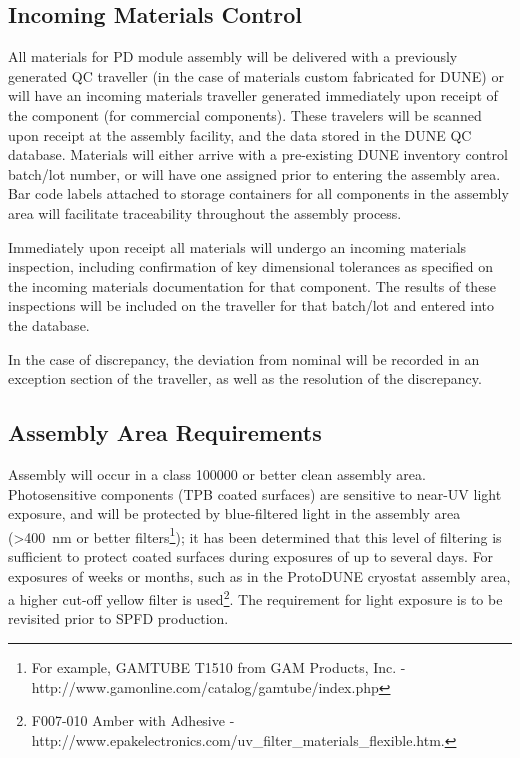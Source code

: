 \subsection{Incoming Materials Control}

All materials for PD module assembly will be delivered with a previously generated QC traveller (in the case of materials custom fabricated for DUNE) or will have an incoming materials traveller generated immediately upon receipt of the component (for commercial components).  These travelers will be scanned upon receipt at the assembly facility, and the data stored in the DUNE QC database.  Materials will either arrive with a pre-existing DUNE inventory control batch/lot number, or will have one assigned prior to entering the assembly area.  Bar code labels attached to storage containers for all components in the assembly area will facilitate traceability throughout the assembly process.

Immediately upon receipt all materials will undergo an incoming materials inspection, including confirmation of key dimensional tolerances as specified on the incoming materials documentation for that component.  The results of these inspections will be included on the traveller for that batch/lot and entered into the database.

In the case of discrepancy, the deviation from nominal will be recorded in an exception section of the traveller, as well as the resolution of the discrepancy.

\subsection{Assembly Area Requirements}

Assembly will occur in a class \num{100000} or better clean assembly area.  Photosensitive components (TPB coated surfaces) are sensitive to near-UV light exposure, and will be protected by blue-filtered light in the assembly area (>\SI{400}{nm} or better filters\footnote{For example, GAMTUBE T1510 from GAM Products, Inc. - http://www.gamonline.com/catalog/gamtube/index.php}); it has been determined that this level of filtering is sufficient to protect coated surfaces during  exposures of up to several days. For exposures of weeks or months, such as in the ProtoDUNE cryostat assembly area, a higher cut-off yellow filter is used\footnote{F007-010 Amber with Adhesive - http://www.epakelectronics.com/uv\_filter\_materials\_flexible.htm.}. 
The requirement for light exposure is to be revisited prior to SPFD production.

